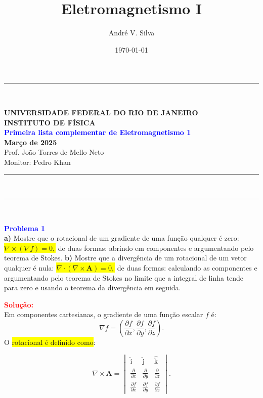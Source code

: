 \documentclass[a4paper,12pt]{article}
\title{ \textbf{\large Eletromagnetismo I }}
\author{Andr\'e V. Silva}
\date{\today}
\begin{document}
\noindent\rule{\linewidth}{0.8pt}\\
\begin{center}
    \textbf{UNIVERSIDADE FEDERAL DO RIO DE JANEIRO}\\
    \textbf{INSTITUTO DE FÍSICA}\\
    \textbf{\textcolor{blue}{Primeira lista complementar de Eletromagnetismo 1}}\\
    \textbf{Março de 2025}\\
    \vspace{0.5cm}
    Prof. João Torres de Mello Neto\\
    Monitor: Pedro Khan
\end{center}
\noindent\rule{\linewidth}{0.8pt}\\
\maketitle


\noindent\rule{\linewidth}{0.4pt}\\

\justifying

\begin{flushleft}
\textbf{\textcolor{blue}{Problema 1}}\\
\textbf{a)} Mostre que o rotacional de um gradiente de uma função qualquer é zero:
\colorbox{yellow}{$\nabla \times (\nabla f) = 0,$} de duas formas: abrindo em componentes e 
argumentando pelo teorema de Stokes. 
\textbf{b)} Mostre que a divergência de um rotacional de um vetor qualquer é nula:
\colorbox{yellow}{$\nabla \cdot (\nabla \times \mathbf{A}) = 0,$} de duas formas: calculando as 
componentes e argumentando pelo teorema de Stokes no limite que a integral de 
linha tende para zero e usando o teorema da divergência em seguida.
\end{flushleft}

\textcolor{red}{\textbf{Solução:}}\\

Em componentes cartesianas, o gradiente de uma função escalar $f$ é:
\begin{equation}
    \nabla f = \left( \frac{\partial f}{\partial x}, \frac{\partial f}{\partial y}, \frac{\partial f}{\partial z} \right).
\end{equation}
O \colorbox{yellow}{rotacional é definido como}:

\begin{equation}
    \nabla \times \mathbf{A} = 
    \begin{vmatrix} 
        \hat{\textrm{i}} & \hat{\textrm{j}} & \hat{\textrm{k}} \\
        \frac{\partial}{\partial x} & \frac{\partial}{\partial y} & \frac{\partial}{\partial z} \\
        \frac{\partial f}{\partial x} & \frac{\partial f}{\partial y} & \frac{\partial f}{\partial z} 
    \end{vmatrix}.
\end{equation}
\end{document}
